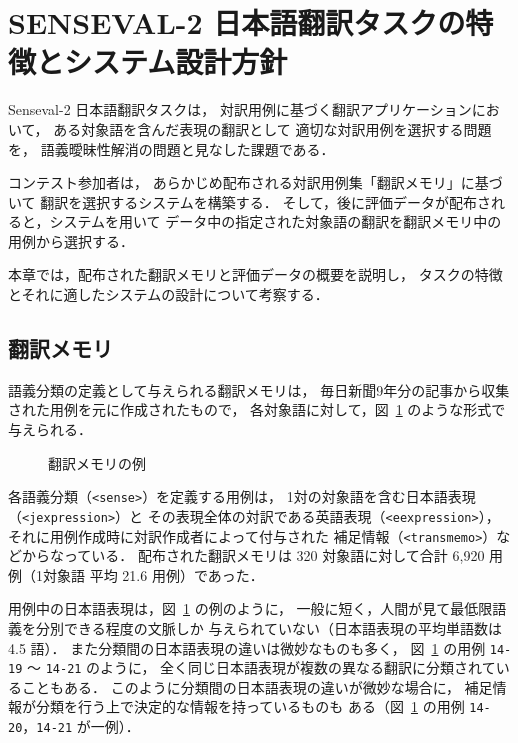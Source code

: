 \section{
	 S{\normalsize\bf ENSEVAL}-2 日本語翻訳タスクの特徴とシステム設計方針}
\label{sec:task}
{\sc Senseval}-2 日本語翻訳タスクは，
対訳用例に基づく翻訳アプリケーションにおいて，
ある対象語を含んだ表現の翻訳として
適切な対訳用例を選択する問題を，
語義曖昧性解消の問題と見なした課題である\cite{kurohashi:01a}．

コンテスト参加者は，
あらかじめ配布される対訳用例集「翻訳メモリ」に基づいて
翻訳を選択するシステムを構築する．
そして，後に評価データが配布されると，システムを用いて
データ中の指定された対象語の翻訳を翻訳メモリ中の用例から選択する．

本章では，配布された翻訳メモリと評価データの概要を説明し，
タスクの特徴とそれに適したシステムの設計について考察する．


\subsection{翻訳メモリ}
\label{sec:TM}
語義分類の定義として与えられる翻訳メモリは，
毎日新聞9年分の記事から収集された用例を元に作成されたもので，
各対象語に対して，図~\ref{fig:TM_entry} のような形式で与えられる．
\begin{figure}[tp]
 \begin{center}
  \begin{minipage}{.8\textwidth}
  \end{minipage}
 \end{center}
 \caption{翻訳メモリの例}
 \label{fig:TM_entry}
\end{figure}
各語義分類（\verb|<sense>|）を定義する用例は，
1対の対象語を含む日本語表現（\verb|<jexpression>|）と
その表現全体の対訳である英語表現（\verb|<eexpression>|），
それに用例作成時に対訳作成者によって付与された
補足情報（\verb|<transmemo>|）などからなっている．
配布された翻訳メモリは 320 対象語に対して合計 6,920 用例（1対象語
平均 21.6 用例）であった．

用例中の日本語表現は，図~\ref{fig:TM_entry} の例のように，
一般に短く，人間が見て最低限語義を分別できる程度の文脈しか
与えられていない（日本語表現の平均単語数は 4.5 語）．
また分類間の日本語表現の違いは微妙なものも多く，
図~\ref{fig:TM_entry} の用例 \verb|14-19| 〜 \verb|14-21| のように，
全く同じ日本語表現が複数の異なる翻訳に分類されていることもある．
このように分類間の日本語表現の違いが微妙な場合に，
補足情報が分類を行う上で決定的な情報を持っているものも
ある（図~\ref{fig:TM_entry} の用例 \verb|14-20|，\verb|14-21| が一例）．


